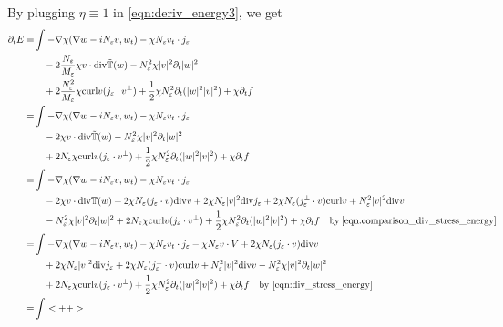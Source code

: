 \documentclass[a4paper]{article}
\newcommand{\curl}{\mathrm{curl}}
\renewcommand{\div}{\mathrm{div}}
\begin{document}
By plugging $\eta \equiv 1$ in \eqref{eqn:deriv_energy3}, we get
\begin{align}
  \partial_t E = & \int_{}^{} -\nabla \chi ( \nabla w - i N_\varepsilon v, w_t) - \chi N_\varepsilon v_t \cdot j_\varepsilon \nonumber \\
  &\quad - 2 \frac{N_\varepsilon}{M_\varepsilon} \chi v \cdot \div \tilde{\mathbb{T}} (w) - N_\varepsilon^2 \chi |v|^2 \partial_t |w|^2 \nonumber \\
  &\quad + 2 \frac{N_\varepsilon^2}{M_\varepsilon} \chi \curl v (j_\varepsilon \cdot v^\perp) + \frac{1}{2} \chi N_\varepsilon^2 \partial_t( |w|^2
  |v|^2) + \chi \partial_t f \nonumber \\
  = &\int_{}^{} -\nabla \chi ( \nabla w - i N_\varepsilon v, w_t ) - \chi N_\varepsilon v_t \cdot j_\varepsilon \nonumber \\
  &\quad - 2 \chi v \cdot \div \tilde{\mathbb{T}}(w) - N_\varepsilon^2 \chi |v|^2 \partial_t |w|^2 \nonumber \\
  &\quad + 2 N_\varepsilon \chi \curl v ( j_\varepsilon \cdot v^\perp) + \frac{1}{2} \chi N_\varepsilon^2 \partial_t( |w|^2 |v|^2 ) + \chi \partial_t f
  \nonumber \\
  = &\int_{}^{} -\nabla \chi (\nabla w - i N_\varepsilon v, w_t) - \chi N_\varepsilon v_t \cdot j_\varepsilon \nonumber \\
  &\quad - 2 \chi v \cdot \div \mathbb{T} (w) + 2 \chi N_\varepsilon (j_\varepsilon \cdot v) \div v + 2 \chi N_\varepsilon |v|^2 \div j_\varepsilon +
  2 \chi N_\varepsilon (j_\varepsilon^\perp \cdot v) \curl v + N_\varepsilon^2 |v|^2 \div v \nonumber \\
  &\quad - N_\varepsilon^2 \chi |v|^2 \partial_t |w|^2 + 2 N_\varepsilon \chi \curl v (j_\varepsilon \cdot v^\perp) + \frac{1}{2} \chi N_\varepsilon^2
  \partial_t( |w|^2 |v|^2 ) + \chi \partial_t f \quad \parbox{5cm}{by \eqref{eqn:comparison_div_stress_energy}} \nonumber \\
  = &\int_{}^{} -\nabla \chi ( \nabla w - i N_\varepsilon v, w_t) - \chi N_\varepsilon v_t \cdot j_\varepsilon - \chi N_\varepsilon v \cdot V + 2 \chi N_\varepsilon (
  j_\varepsilon \cdot v) \div v \nonumber \\
  &\quad + 2 \chi N_\varepsilon |v|^2 \div j_\varepsilon + 2 \chi N_\varepsilon (j_\varepsilon^\perp \cdot v ) \curl v + N_\varepsilon^2 |v|^2 \div v
  - N_\varepsilon^2 \chi |v|^2 \partial_t |w|^2 \nonumber \\
  &\quad + 2 N_\varepsilon \chi \curl v ( j_\varepsilon \cdot v^\perp) + \frac{1}{2} \chi N_\varepsilon^2
  \partial_t( |w|^2 |v|^2) + \chi \partial_t f \quad \parbox{5cm}{by \eqref{eqn:div_stress_energy}} \nonumber \\
  = &\int_{}^{}<++>
  \label{eqn:comparison_deriv_energy}
\end{align}
\end{document}
